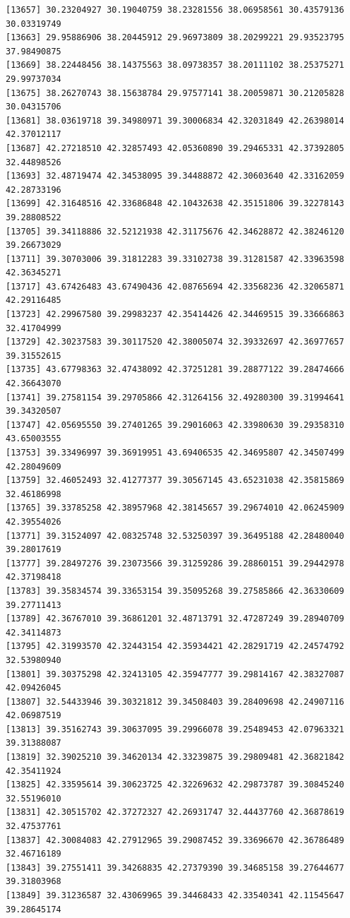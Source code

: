 \documentclass[
  letterpaper,
  DIV=11,
  numbers=noendperiod]{scrartcl}
\begin{document}
\begin{verbatim}
[13657] 30.23204927 30.19040759 38.23281556 38.06958561 30.43579136 30.03319749
[13663] 29.95886906 38.20445912 29.96973809 38.20299221 29.93523795 37.98490875
[13669] 38.22448456 38.14375563 38.09738357 38.20111102 38.25375271 29.99737034
[13675] 38.26270743 38.15638784 29.97577141 38.20059871 30.21205828 30.04315706
[13681] 38.03619718 39.34980971 39.30006834 42.32031849 42.26398014 42.37012117
[13687] 42.27218510 42.32857493 42.05360890 39.29465331 42.37392805 32.44898526
[13693] 32.48719474 42.34538095 39.34488872 42.30603640 42.33162059 42.28733196
[13699] 42.31648516 42.33686848 42.10432638 42.35151806 39.32278143 39.28808522
[13705] 39.34118886 32.52121938 42.31175676 42.34628872 42.38246120 39.26673029
[13711] 39.30703006 39.31812283 39.33102738 39.31281587 42.33963598 42.36345271
[13717] 43.67426483 43.67490436 42.08765694 42.33568236 42.32065871 42.29116485
[13723] 42.29967580 39.29983237 42.35414426 42.34469515 39.33666863 32.41704999
[13729] 42.30237583 39.30117520 42.38005074 32.39332697 42.36977657 39.31552615
[13735] 43.67798363 32.47438092 42.37251281 39.28877122 39.28474666 42.36643070
[13741] 39.27581154 39.29705866 42.31264156 32.49280300 39.31994641 39.34320507
[13747] 42.05695550 39.27401265 39.29016063 42.33980630 39.29358310 43.65003555
[13753] 39.33496997 39.36919951 43.69406535 42.34695807 42.34507499 42.28049609
[13759] 32.46052493 32.41277377 39.30567145 43.65231038 42.35815869 32.46186998
[13765] 39.33785258 42.38957968 42.38145657 39.29674010 42.06245909 42.39554026
[13771] 39.31524097 42.08325748 32.53250397 39.36495188 42.28480040 39.28017619
[13777] 39.28497276 39.23073566 39.31259286 39.28860151 39.29442978 42.37198418
[13783] 39.35834574 39.33653154 39.35095268 39.27585866 42.36330609 39.27711413
[13789] 42.36767010 39.36861201 32.48713791 32.47287249 39.28940709 42.34114873
[13795] 42.31993570 42.32443154 42.35934421 42.28291719 42.24574792 32.53980940
[13801] 39.30375298 42.32413105 42.35947777 39.29814167 42.38327087 42.09426045
[13807] 32.54433946 39.30321812 39.34508403 39.28409698 42.24907116 42.06987519
[13813] 39.35162743 39.30637095 39.29966078 39.25489453 42.07963321 39.31388087
[13819] 32.39025210 39.34620134 42.33239875 39.29809481 42.36821842 42.35411924
[13825] 42.33595614 39.30623725 42.32269632 42.29873787 39.30845240 32.55196010
[13831] 42.30515702 42.37272327 42.26931747 32.44437760 42.36878619 32.47537761
[13837] 42.30084083 42.27912965 39.29087452 39.33696670 42.36786489 32.46716189
[13843] 39.27551411 39.34268835 42.27379390 39.34685158 39.27644677 39.31803968
[13849] 39.31236587 32.43069965 39.34468433 42.33540341 42.11545647 39.28645174

\end{verbatim}
\end{document}
